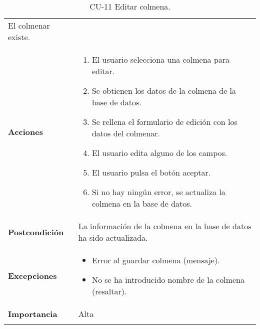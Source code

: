 \begin{longtable}[H]{@{}ll@{}}
\begin{minipage}[t]{0.68\columnwidth}
El colmenar existe.\strut
\end{minipage}\tabularnewline
\begin{minipage}[t]{0.26\columnwidth}\raggedright\strut
\textbf{Acciones}\strut
\end{minipage} & \begin{minipage}[t]{0.68\columnwidth}\raggedright\strut
\begin{enumerate}
\def\labelenumi{\arabic{enumi}.}
\tightlist
\item
  El usuario selecciona una colmena para editar.
\item
  Se obtienen los datos de la colmena de la base de datos.
\item
  Se rellena el formulario de edición con los datos del colmenar.
\item
  El usuario edita alguno de los campos.
\item
  El usuario pulsa el botón aceptar.
\item
  Si no hay ningún error, se actualiza la colmena en la base de datos.
\end{enumerate}\strut
\end{minipage}\tabularnewline
\begin{minipage}[t]{0.26\columnwidth}\raggedright\strut
\textbf{Postcondición}\strut
\end{minipage} & \begin{minipage}[t]{0.68\columnwidth}\raggedright\strut
La información de la colmena en la base de datos ha sido
actualizada.\strut
\end{minipage}\tabularnewline
\begin{minipage}[t]{0.26\columnwidth}\raggedright\strut
\textbf{Excepciones}\strut
\end{minipage} & \begin{minipage}[t]{0.68\columnwidth}\raggedright\strut
\begin{itemize}
\tightlist
\item
  Error al guardar colmena (mensaje).
\item
  No se ha introducido nombre de la colmena (resaltar).
\end{itemize}\strut
\end{minipage}\tabularnewline
\begin{minipage}[t]{0.26\columnwidth}\raggedright\strut
\textbf{Importancia}\strut
\end{minipage} & \begin{minipage}[t]{0.68\columnwidth}\raggedright\strut
Alta\strut
\end{minipage}\tabularnewline
\bottomrule
\caption{CU-11 Editar colmena.}
\end{longtable}

